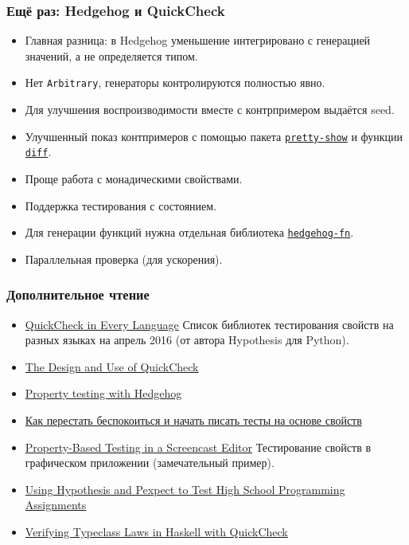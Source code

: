 \documentclass[11pt]{beamer}
\begin{document}
\begin{frame}[fragile]
\frametitle{Ещё раз: Hedgehog и QuickCheck}
\begin{itemize}
    \item Главная разница: в Hedgehog уменьшение интегрировано с генерацией значений, а не определяется типом.
    \item Нет \lstinline|Arbitrary|, генераторы контролируются полностью явно.
    \item Для улучшения воспроизводимости вместе с контрпримером выдаётся seed.
    \item Улучшенный показ контпримеров с помощью пакета \href{https://hackage.haskell.org/package/pretty-show}{\lstinline|pretty-show|} и функции \href{http://hackage.haskell.org/package/hedgehog-1.0/docs/Hedgehog.html#v:diff}{\lstinline|diff|}.
    \item Проще работа с монадическими свойствами.
    \item Поддержка тестирования с состоянием.
    \item Для генерации функций нужна отдельная библиотека \href{https://hackage.haskell.org/package/hedgehog-fn}{\lstinline|hedgehog-fn|}.
    \item Параллельная проверка (для ускорения).
\end{itemize}
\end{frame}

\begin{frame}[fragile]
\frametitle{Дополнительное чтение}
\begin{itemize}
    \item \href{https://hypothesis.works/articles/quickcheck-in-every-language/}{QuickCheck in Every Language} Список библиотек тестирования свойств на разных языках на апрель 2016 (от автора Hypothesis для Python).
    \item \href{https://begriffs.com/posts/2017-01-14-design-use-quickcheck.html}{The Design and Use of QuickCheck}
    \item \href{https://teh.id.au/posts/2017/04/23/property-testing-with-hedgehog/}{Property testing with Hedgehog}
    \item \href{https://habr.com/ru/post/434008/}{Как перестать беспокоиться и начать писать тесты на основе свойств}
    \item \href{https://wickstrom.tech/programming/2019/03/02/property-based-testing-in-a-screencast-editor-introduction.html}{Property-Based Testing in a Screencast Editor} Тестирование свойств в графическом приложении (замечательный пример).
    \item \href{https://blog.jrheard.com/hypothesis-and-pexpect}{Using Hypothesis and Pexpect to Test High School Programming Assignments}
    \item \href{https://austinrochford.com/posts/2014-05-27-quickcheck-laws.html}{Verifying Typeclass Laws in Haskell with QuickCheck}
    \end{itemize}
\end{frame}
\end{document}
